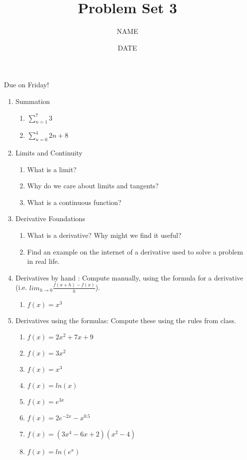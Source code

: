 \documentclass[12pt,thmsa]{article}
\title{Problem Set 3}
\author{NAME}
\date{DATE}
\begin{document}
\maketitle 

Due on Friday!   

\begin{enumerate}

    \item Summation
        \begin{enumerate}
            \item $\sum_{n=1}^{7}3$
            \item $\sum_{n=0}^{4} 2n+8$
        \end{enumerate}

    \item Limits and Continuity
        \begin{enumerate}
            \item What is a limit?
            \item Why do we care about limits and tangents?
            \item What is a continuous function?
        \end{enumerate}

\item Derivative Foundations
\begin{enumerate}
\item What is a derivative? Why might we find it useful? 
\item Find an example on the internet of a derivative used to solve a problem in real life. 
\end{enumerate}

\item Derivatives by hand : Compute manually, using the formula for a derivative (i.e. $ lim_{h\rightarrow0}\frac{f(x+h)-f(x)}{h}$). 
\begin{enumerate}
\item  $f(x) =x^3$
\end{enumerate}

\item Derivatives using the formulas: Compute these using the rules from class. 
\begin{enumerate}
\item  $f(x) = 2x^2 + 7x + 9$ 
\item  $f(x) = 3x^2$
\item  $f(x) =x^3$
\item  $f(x)=ln(x)$
\item $f(x)=e^{3x}$
\item $f(x)=2e^{-2x}-x^{0.5}$
\item $f(x)=(3x^4-6x+2)(x^2-4)$
\item $f(x)=ln(e^x)$
\end{enumerate}


\end{enumerate}
\end{document}
